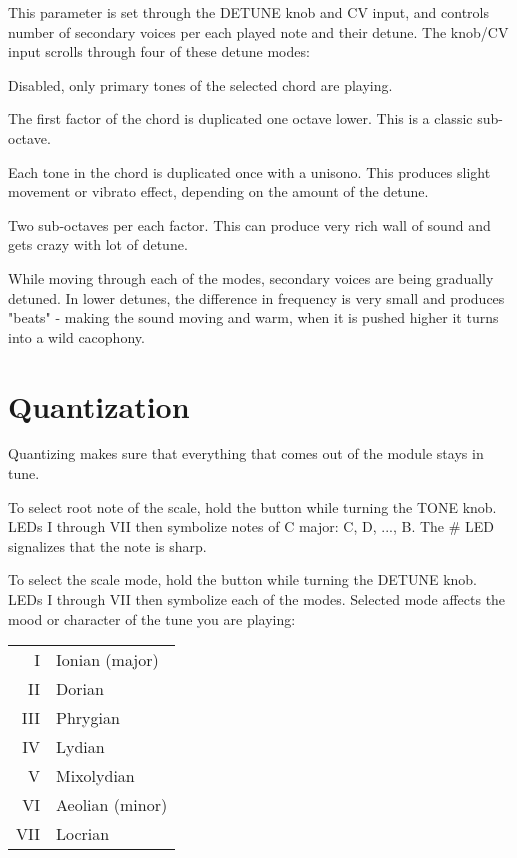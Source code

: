\documentclass[10pt,nofoldmark,nocombine]{leaflet} %
\newenvironment{packed_enumerate_i}{
\begin{enumerate}[I]
  \setlength{\itemsep}{1pt}
  \setlength{\parskip}{0pt}
  \setlength{\parsep}{0pt}
}{\end{enumerate}}
\begin{document}
This parameter is set through the DETUNE knob and CV input, and controls number of secondary voices per each played note and their detune. The knob/CV input scrolls through four of these detune modes:

\begin{packed_enumerate_i}
  \item Disabled, only primary tones of the selected chord are playing.
  \item The first factor of the chord is duplicated one octave lower. This is a classic sub-octave.
  \item Each tone in the chord is duplicated once with a unisono. This produces slight movement or vibrato effect, depending on the amount of the detune.
  \item Two sub-octaves per each factor. This can produce very rich wall of sound and gets crazy with lot of detune.
\end{packed_enumerate_i}

While moving through each of the modes, secondary voices are being gradually detuned. In lower detunes, the difference in frequency is very small and produces "beats" - making the sound moving and warm, when it is pushed higher it turns into a wild cacophony.

\section{Quantization}

Quantizing makes sure that everything that comes out of the module stays in tune.

To select root note of the scale, hold the button while turning the TONE knob. LEDs I through VII then symbolize notes of C major: C, D, ..., B. The \# LED signalizes that the note is sharp.

To select the scale mode, hold the button while turning the DETUNE knob. LEDs I through VII then symbolize each of the modes. Selected mode affects the mood or character of the tune you are playing:

\begin{tabular}{@{}rl@{}}
  I & Ionian (major) \\
  II & Dorian \\
  III & Phrygian \\
  IV & Lydian \\
  V & Mixolydian \\
  VI & Aeolian (minor) \\
  VII & Locrian
\end{tabular}
\end{document}
